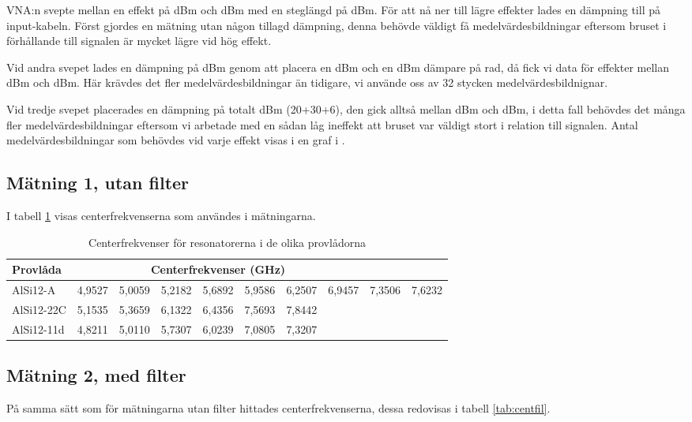 \documentclass[main.tex]{subfiles}
\begin{document}
VNA:n svepte mellan en effekt på \unit[8]{dBm} och \unit[-27]{dBm} med en steglängd på \unit[2,5]{dBm}. För att nå ner till lägre effekter lades en dämpning till på input-kabeln. Först gjordes en mätning utan någon tillagd dämpning, denna behövde väldigt få medelvärdesbildningar eftersom bruset i förhållande till signalen är mycket lägre vid hög effekt. 

Vid andra svepet lades en dämpning på \unit[30]{dBm} genom att placera en \unit[20]{dBm} och en \unit[10]{dBm} dämpare på rad, då fick vi data för effekter mellan \unit[-22]{dBm} och \unit[-52]{dBm}. Här krävdes det fler medelvärdesbildningar än tidigare, vi använde oss av 32 stycken medelvärdesbildnignar. 

Vid tredje svepet placerades en dämpning på totalt \unit[56]{dBm} (20+30+6), den gick alltså mellan \unit[-44]{dBm} och \unit[-83]{dBm}, i detta fall behövdes det många fler medelvärdesbildningar eftersom vi arbetade med en sådan låg ineffekt att bruset var väldigt stort i relation till signalen. Antal medelvärdesbildningar som behövdes vid varje effekt visas i en graf i .

\subsection{Mätning 1, utan filter} 

I tabell \ref{tab:utanfil} visas centerfrekvenserna som användes i mätningarna.

\begin{table}[h]
    \centering
        \caption{Centerfrekvenser för resonatorerna i de olika provlådorna}
    \label{tab:utanfil}
    \begin{tabular}{lccccccccc}
    \toprule
        \textbf{Provlåda}  & \multicolumn{7}{c}{Centerfrekvenser (GHz)} \\
        \midrule
        AlSi12-A & 4,9527 & 5,0059 & 5,2182 & 5,6892 & 5,9586 & 6,2507 & 6,9457 & 7,3506 & 7,6232\\
        AlSi12-22C & 5,1535 & 5,3659 & 6,1322 & 6,4356 & 7,5693 & 7,8442 &\\
        AlSi12-11d & 4,8211 & 5,0110 & 5,7307 & 6,0239 & 7,0805  &  7,3207 & \\
        \bottomrule
    \end{tabular}
\end{table}



\subsection{Mätning 2, med filter}
På samma sätt som för mätningarna utan filter hittades centerfrekvenserna, dessa redovisas i tabell \ref{tab:centfil}.
\end{document}
